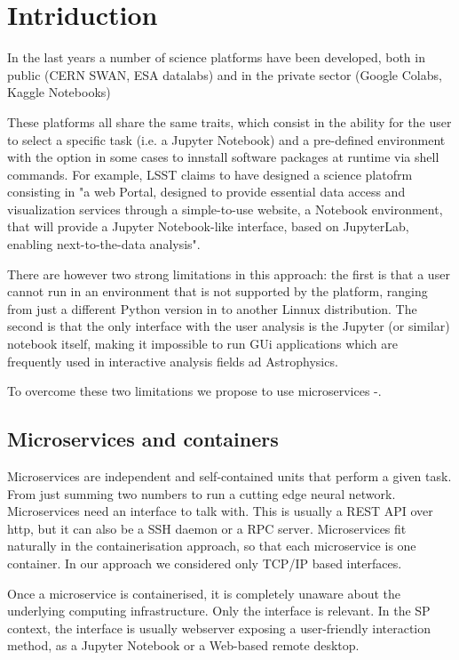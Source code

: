 \documentclass[11pt,twoside]{article}
\begin{document}
\section{Intriduction}
In the last years a number of science platforms have been developed, both in public (CERN SWAN, ESA datalabs) and in the private sector (Google Colabs, Kaggle Notebooks) \citep[such as][]{juric2017lsst}


These platforms all share the same traits, which consist in the ability for the user to select a specific task (i.e. a Jupyter Notebook) and a pre-defined environment with the option in some cases to innstall software packages at runtime via shell commands. For example, LSST claims to have designed a science platofrm consisting in "a web Portal, designed to provide essential data access and visualization services through a simple-to-use website, a Notebook environment, that will provide a Jupyter Notebook-like interface, based on JupyterLab, enabling next-to-the-data analysis".

There are however two strong limitations in this approach: the first is that a user cannot run in an environment that is not supported by the platform, ranging from just a different Python version in to another Linnux distribution. The second is that the only interface with the user analysis is the Jupyter (or similar) notebook itself, making it impossible to run GUi applications which are frequently used in interactive analysis fields ad Astrophysics.

To overcome these two limitations we propose to use microservices -.


\subsection{Microservices and containers}
Microservices are independent and self-contained units that perform a given task. From just summing two numbers to run a cutting edge neural network. Microservices need an interface to talk with. This is usually a REST API over http, but it can also be a SSH daemon or a RPC server. Microservices fit naturally in the containerisation approach, so that each microservice is one container.  In our approach we considered only TCP/IP based interfaces.

Once a microservice is containerised, it is completely unaware about the underlying computing infrastructure. Only the interface is relevant. In the SP context, the interface is usually webserver exposing a user-friendly interaction method, as a Jupyter Notebook or a Web-based remote desktop.
\end{document}

